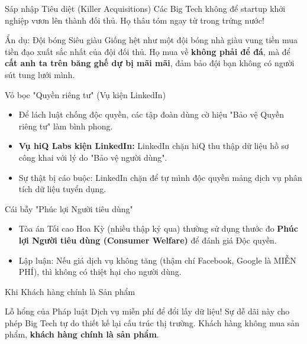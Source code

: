 \documentclass[aspectratio=169]{beamer}
\begin{document}
\begin{frame}{Sáp nhập Tiêu diệt (Killer Acquisitions)}
    Các Big Tech không để startup khởi nghiệp vươn lên thành đối thủ. Họ thâu tóm ngay từ trong trứng nước!
    \begin{exampleblock}{Ẩn dụ: Đội bóng Siêu giàu}
        Giống hệt như một đội bóng nhà giàu vung tiền mua tiền đạo xuất sắc nhất của đội đối thủ. Họ mua về \textbf{không phải để đá}, mà để \textbf{cất anh ta trên băng ghế dự bị mãi mãi}, đảm bảo đội bạn không có người sút tung lưới mình.
    \end{exampleblock}
\end{frame}

\begin{frame}{Vỏ bọc "Quyền riêng tư" (Vụ kiện LinkedIn)}
    \begin{itemize}
        \item Để lách luật chống độc quyền, các tập đoàn dùng cờ hiệu "Bảo vệ Quyền riêng tư" làm bình phong.
        \item \textbf{Vụ hiQ Labs kiện LinkedIn:} LinkedIn chặn hiQ thu thập dữ liệu hồ sơ công khai với lý do "Bảo vệ người dùng". 
        \item Sự thật bị cáo buộc: LinkedIn chặn để tự mình độc quyền mảng dịch vụ phân tích dữ liệu tuyển dụng.
    \end{itemize}
\end{frame}

\begin{frame}{Cái bẫy "Phúc lợi Người tiêu dùng"}
    \begin{itemize}
        \item Tòa án Tối cao Hoa Kỳ (nhiều thập kỷ qua) thường sử dụng thước đo \textbf{Phúc lợi Người tiêu dùng (Consumer Welfare)} để đánh giá Độc quyền. 
        \item Lập luận: Nếu giá dịch vụ không tăng (thậm chí Facebook, Google là MIỄN PHÍ), thì không có thiệt hại cho người dùng.
    \end{itemize}
\end{frame}

\begin{frame}{Khi Khách hàng chính là Sản phẩm}
    \begin{alertblock}{Lỗ hổng của Pháp luật}
        Dịch vụ miễn phí để đổi lấy dữ liệu! Sự dễ dãi này cho phép Big Tech tự do thiết kế lại cấu trúc thị trường. Khách hàng không mua sản phẩm, \textbf{khách hàng chính là sản phẩm}.
    \end{alertblock}
\end{frame}
\end{document}
